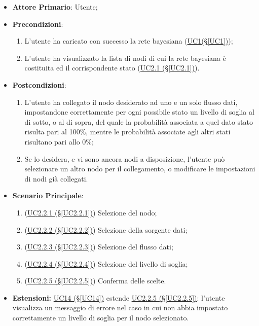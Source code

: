 \begin{itemize}
\item \textbf{Attore Primario}: Utente;
\item \textbf{Precondizioni}: 
\begin{enumerate}
	\item L'utente ha caricato con successo la rete bayesiana (\hyperref[UC1]{UC1(§\ref*{UC1})});
	\item L'utente ha visualizzato la lista di nodi di cui la rete bayesiana è costituita ed il corrispondente stato 			(\hyperref[UC2.1]{UC2.1 (§\ref*{UC2.1})}).
\end{enumerate}
\item \textbf{Postcondizioni}: 
	\begin{enumerate}
	\item L'utente ha collegato il nodo desiderato ad uno e un solo flusso dati, impostandone correttamente per ogni possibile stato un livello di soglia al di sotto, o al di sopra, del quale la probabilità associata a quel dato stato risulta pari al 100\%, mentre le probabilità associate agli altri stati risultano pari allo 0\%;
	\item Se lo desidera, e vi sono ancora nodi a disposizione, l’utente può selezionare un altro nodo per il collegamento, o modificare le impostazioni di nodi già collegati.
	\end{enumerate}
\item \textbf{Scenario Principale}:
 \begin{enumerate}
 \item (\hyperref[UC2.2.1]{UC2.2.1 (§\ref*{UC2.2.1})}) Selezione del nodo;
 \item (\hyperref[UC2.2.2]{UC2.2.2 (§\ref*{UC2.2.2})}) Selezione della sorgente dati;
 \item (\hyperref[UC2.2.3]{UC2.2.3 (§\ref*{UC2.2.3})}) Selezione del flusso dati;
 \item (\hyperref[UC2.2.4]{UC2.2.4 (§\ref*{UC2.2.4})}) Selezione del livello di soglia;
 \item (\hyperref[UC2.2.5]{UC2.2.5 (§\ref*{UC2.2.5})}) Conferma delle scelte.
 \end{enumerate}
\item \textbf{Estensioni:} \hyperref[UC14]{UC14 (§\ref*{UC14})} estende \hyperref[UC2.2.5]{UC2.2.5 (§\ref*{UC2.2.5})}: l'utente visualizza un messaggio di errore nel caso in cui non abbia impostato correttamente 	un livello di soglia per il nodo selezionato.
\end{itemize}

